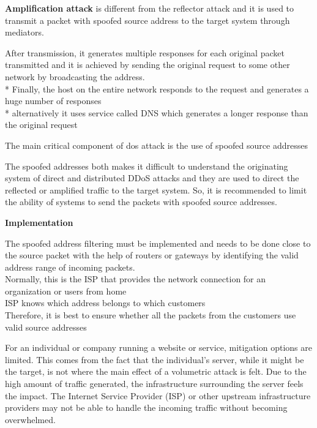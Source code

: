 \documentclass[../CIT288SecurityResearchNotebook.tex]{subfiles}
\begin{document}

{\bf{Amplification attack}} is different from the reflector attack and it is
used to transmit a packet with spoofed source address to the target system
through mediators.


\noindent * After transmission, it generates multiple responses for each
original packet transmitted and it is achieved by sending the original
request to some other network by broadcasting the address.
\\* Finally, the host on the entire network responds to the request and generates a huge number of responses
\\* alternatively it uses service called DNS which generates a longer response than the original request




The main critical component of dos attack is the use of 
spoofed source addresses


The spoofed addresses both makes it difficult to understand the originating 
system of direct and distributed DDoS attacks and they are used to direct the
reflected or amplified traffic to the target system.
So, it is recommended to limit the ability of systems to send the packets with
spoofed source addresses.

\begin{center}
{\bf{Implementation}}
\end{center}
The spoofed address filtering must be implemented and needs to be done close
to the source packet with the help of routers or gateways by identifying the
valid address range of incoming packets.
\\Normally, this is the ISP that provides the network connection for an
organization or users from home
\\ISP knows which address belongs to which customers
\\Therefore, it is best to ensure whether all the packets from the customers
use valid source addresses


For an individual or company running a website or service, mitigation 
options are limited. This comes from the fact that the individual’s 
server, while it might be the target, is not where the main effect 
of a volumetric attack is felt. Due to the high amount of traffic 
generated, the infrastructure surrounding the server feels the impact. 
The Internet Service Provider (ISP) or other upstream infrastructure 
providers may not be able to handle the incoming traffic without 
becoming overwhelmed. 
\end{document}
